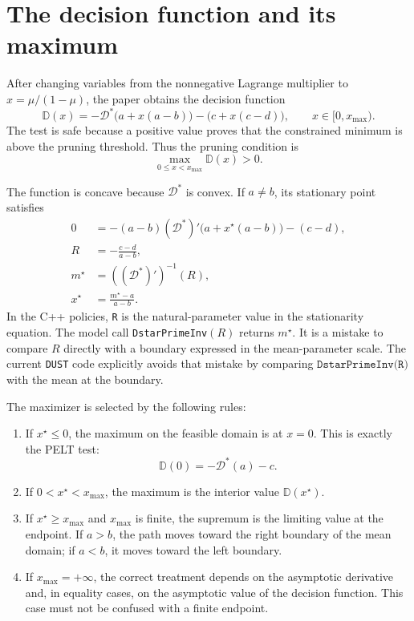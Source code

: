 \documentclass[11pt]{article}
\newcommand{\Dstar}{\mathcal{D}^*}
\begin{document}
\section{The decision function and its maximum}

After changing variables from the nonnegative Lagrange multiplier to
$x=\mu/(1-\mu)$, the paper obtains the decision function
\begin{equation}
  \mathbb{D}(x)
  =-\Dstar\bigl(a+x(a-b)\bigr)-\bigl(c+x(c-d)\bigr),
  \qquad x\in[0,x_{\max}).
  \label{eq:decision}
\end{equation}
The test is safe because a positive value proves that the constrained
minimum is above the pruning threshold.  Thus the pruning condition is
\begin{equation}
  \max_{0\leq x<x_{\max}}\mathbb{D}(x)>0.
  \label{eq:prune}
\end{equation}

The function is concave because $\Dstar$ is convex.  If $a\neq b$, its
stationary point satisfies
\begin{align}
  0&=-(a-b)(\Dstar)'\bigl(a+x^\star(a-b)\bigr)-(c-d),
  \\[-2pt]
  R&=-\frac{c-d}{a-b},
  \label{eq:R}\\
  m^\star&=((\Dstar)')^{-1}(R),
  \\[-2pt]
  x^\star&=\frac{m^\star-a}{a-b}.
  \label{eq:xstar}
\end{align}
In the C++ policies, \texttt{R} is the natural-parameter value in the
stationarity equation.  The model call \texttt{DstarPrimeInv}$(R)$ returns
$m^\star$.
It is a mistake to compare $R$ directly with a boundary expressed in the
mean-parameter scale.  The current \texttt{DUST} code explicitly avoids that
mistake by comparing $\texttt{DstarPrimeInv(R)}$ with the mean at the boundary.

The maximizer is selected by the following rules:

\begin{enumerate}
  \item If $x^\star\leq0$, the maximum on the feasible domain is at $x=0$.
        This is exactly the PELT test:
        \begin{equation}
          \mathbb{D}(0)=-\Dstar(a)-c.
          \label{eq:pelt}
        \end{equation}
  \item If $0<x^\star<x_{\max}$, the maximum is the interior value
        $\mathbb{D}(x^\star)$.
  \item If $x^\star\geq x_{\max}$ and $x_{\max}$ is finite, the supremum is
        the limiting value at the endpoint.  If $a>b$, the path moves toward
        the right boundary of the mean domain; if $a<b$, it moves toward the
        left boundary.
  \item If $x_{\max}=+\infty$, the correct treatment depends on the
        asymptotic derivative and, in equality cases, on the asymptotic value
        of the decision function.  This case must not be confused with a
        finite endpoint.
\end{enumerate}
\end{document}
